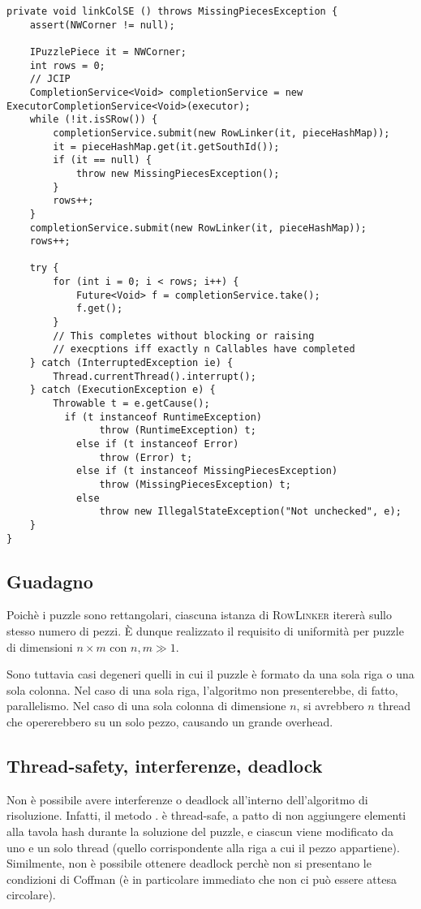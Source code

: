 \documentclass[a4paper]{article}
\newcommand{\Classname}[1]{\textsc{#1}}
\begin{document}
\begin{verbatim}
private void linkColSE () throws MissingPiecesException {
	assert(NWCorner != null);
	
	IPuzzlePiece it = NWCorner;
	int rows = 0;
	// JCIP
	CompletionService<Void> completionService = new ExecutorCompletionService<Void>(executor);
	while (!it.isSRow()) {
		completionService.submit(new RowLinker(it, pieceHashMap));
		it = pieceHashMap.get(it.getSouthId());
		if (it == null) {
			throw new MissingPiecesException();
		}
		rows++;
	}
	completionService.submit(new RowLinker(it, pieceHashMap));
	rows++;

	try {
		for (int i = 0; i < rows; i++) {
			Future<Void> f = completionService.take();
			f.get();
		}
		// This completes without blocking or raising
		// execptions iff exactly n Callables have completed
	} catch (InterruptedException ie) {
		Thread.currentThread().interrupt();
	} catch (ExecutionException e) {
		Throwable t = e.getCause();
		  if (t instanceof RuntimeException) 
	            throw (RuntimeException) t;
	        else if (t instanceof Error)
	            throw (Error) t;
	        else if (t instanceof MissingPiecesException)
	        	throw (MissingPiecesException) t;
	        else
	            throw new IllegalStateException("Not unchecked", e);
	}
}

\end{verbatim}

\subsection{Guadagno}
Poich\`e i puzzle sono rettangolari, ciascuna istanza di \Classname{RowLinker} iterer\`a sullo stesso numero di pezzi.
\`E dunque realizzato il requisito di uniformit\`a per puzzle di dimensioni $n \times m$ con $n, m \gg 1$.

Sono tuttavia casi degeneri quelli in cui il puzzle \`e formato da una sola riga o una sola colonna.
Nel caso di una sola riga, l'algoritmo non presenterebbe, di fatto, parallelismo.
Nel caso di una sola colonna di dimensione $n$, si avrebbero $n$ thread che opererebbero su un solo pezzo, causando un grande overhead.

\subsection{Thread-safety, interferenze, deadlock}
Non \`e possibile avere interferenze o deadlock all'interno dell'algoritmo di risoluzione.
Infatti, il metodo . \`e thread-safe, a patto di non aggiungere elementi alla tavola hash durante la soluzione del puzzle, e ciascun  viene modificato da uno e un solo thread (quello corrispondente alla riga a cui il pezzo appartiene).
Similmente, non \`e possibile ottenere deadlock perch\`e non si presentano le condizioni di Coffman (\`e in particolare immediato che non ci pu\`o essere attesa circolare).
\end{document}
